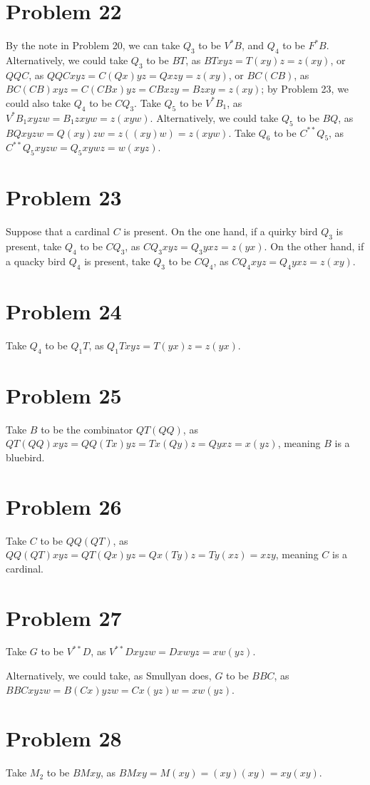 \documentclass{article}
\theoremstyle{definition}
\begin{document}
\section*{Problem 22}
By the note in Problem 20, we can take $Q_3$ to be $V^*B$, and $Q_4$ to be $F^*B$. Alternatively, we could take $Q_3$ to be 
$BT$, as $BTxyz=T(xy)z=z(xy)$, or $QQC$, as $QQCxyz=C(Qx)yz=Qxzy=z(xy)$, or $BC(CB)$, as $BC(CB)xyz=C(CBx)yz=CBxzy=Bzxy=z(xy)$; by Problem 23, we could also take 
$Q_4$ to be $CQ_3$. Take $Q_5$ to be $V^*B_1$, as $V^*B_1xyzw=B_1zxyw=z(xyw)$. Alternatively, we could take $Q_5$ to be $BQ$, as 
$BQxyzw=Q(xy)zw=z((xy)w)=z(xyw)$. Take $Q_6$ to be $C^{**}Q_5$, as
$C^{**}Q_5xyzw=Q_5xywz=w(xyz)$. 

\section*{Problem 23}
Suppose that a cardinal $C$ is present. On the one hand, if a quirky bird $Q_3$ is present, take $Q_4$ to be $CQ_3$, as 
$CQ_3xyz=Q_3yxz=z(yx)$. On the other hand, if a quacky bird $Q_4$ is present, take $Q_3$ to be $CQ_4$, as $CQ_4xyz=Q_4yxz=z(xy)$.

\section*{Problem 24}
Take $Q_4$ to be $Q_1T$, as $Q_1Txyz=T(yx)z=z(yx)$.

\section*{Problem 25}
Take $B$ to be the combinator $QT(QQ)$, as $QT(QQ)xyz=QQ(Tx)yz=Tx(Qy)z=Qyxz=x(yz)$, meaning $B$ is a bluebird. 

\section*{Problem 26}
Take $C$ to be $QQ(QT)$, as $QQ(QT)xyz=QT(Qx)yz=Qx(Ty)z=Ty(xz)=xzy$, meaning $C$ is a cardinal.

\section*{Problem 27}
Take $G$ to be $V^{**}D$, as $V^{**}Dxyzw=Dxwyz=xw(yz)$.


Alternatively, we could take, as Smullyan does, $G$ to be $BBC$, as $BBCxyzw=B(Cx)yzw=Cx(yz)w=xw(yz)$.

\section*{Problem 28}
Take $M_2$ to be $BMxy$, as $BMxy=M(xy)=(xy)(xy)=xy(xy)$.
\end{document}

